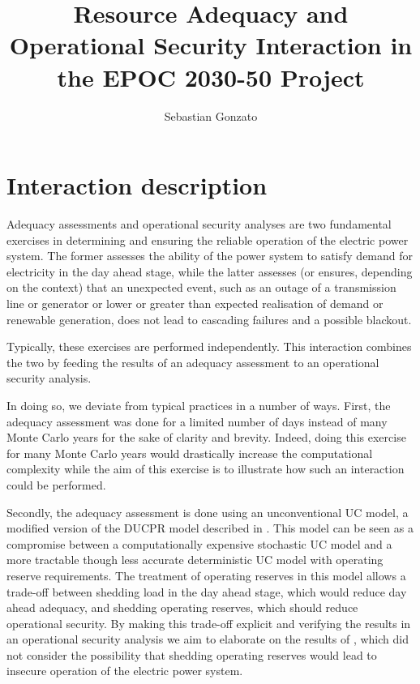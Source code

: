 \documentclass[number,times]{elsarticle}
\begin{document}
\title{Resource Adequacy and Operational Security Interaction in the EPOC 2030-50 Project}

\author{Sebastian Gonzato}

\maketitle

\newpage

\tableofcontents



\newpage

\section{Interaction description}

Adequacy assessments and operational security analyses are two fundamental exercises in determining and ensuring the reliable operation of the electric power system. The former assesses the ability of the power system to satisfy demand for electricity in the day ahead stage, while the latter assesses (or ensures, depending on the context) that an unexpected event, such as an outage of a transmission line or generator or lower or greater than expected realisation of demand or renewable generation, does not lead to cascading failures and a possible blackout.

Typically, these exercises are performed independently. This interaction combines the two by feeding the results of an adequacy assessment to an operational security analysis.

In doing so, we deviate from typical practices in a number of ways. First, the adequacy assessment was done for a limited number of days instead of many Monte Carlo years for the sake of clarity and brevity. Indeed, doing this exercise for many Monte Carlo years would drastically increase the computational complexity while the aim of this exercise is to illustrate how such an interaction could be performed.

Secondly, the adequacy assessment is done using an unconventional \ac{UC} model, a modified version of the \ac{DUCPR} model described in \cite{Bruninx2017}. This model can be seen as a compromise between a computationally expensive stochastic \ac{UC} model and a more tractable though less accurate deterministic \ac{UC} model with operating reserve requirements. The treatment of operating reserves in this model allows a trade-off between shedding load in the day ahead stage, which would reduce day ahead adequacy, and shedding operating reserves, which should reduce operational security. By making this trade-off explicit and verifying the results in an operational security analysis we aim to elaborate on the results of \cite{Hermans2018}, which did not consider the possibility that shedding operating reserves would lead to insecure operation of the electric power system.
\end{document}
